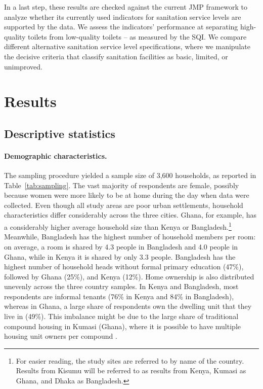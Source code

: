 \documentclass[natbib]{svjour3}                     %
\begin{document}
In a last step, these results are checked against the current JMP framework to analyze whether its currently used indicators for sanitation service levels are supported by the data. We assess the indicators’ performance at separating high-quality toilets from low-quality toilets -- as measured by the SQI. We compare different alternative sanitation service level specifications, where we manipulate the decisive criteria that classify sanitation facilities as basic, limited, or unimproved. 

\FloatBarrier
\section{Results}
\label{sec:results}

\subsection{Descriptive statistics}
\paragraph{Demographic characteristics.}
The sampling procedure yielded a sample size of 3,600 households, as reported in Table~\ref{tab:sampling}. The vast majority of respondents are female, possibly because women were more likely to be at home during the day when data were collected. Even though all study areas are poor urban settlements, household characteristics differ considerably across the three cities. Ghana, for example, has a considerably higher average household size than Kenya or Bangladesh.\footnote{For easier reading, the study sites are referred to by name of the country. Results from Kisumu will be referred to as results from Kenya, Kumasi as Ghana, and Dhaka as Bangladesh.} Meanwhile, Bangladesh has the highest number of household members per room: on average, a room is shared by 4.3 people in Bangladesh and 4.0 people in Ghana, while in Kenya it is shared by only 3.3 people. Bangladesh has the highest number of household heads without formal primary education (47\%), followed by Ghana (25\%), and Kenya (12\%). Home ownership is also distributed unevenly across the three country samples. In Kenya and Bangladesh, most respondents are informal tenants (76\% in Kenya and 84\% in Bangladesh), whereas in Ghana, a large share of respondents own the dwelling unit that they live in (49\%). This imbalance might be due to the large share of traditional compound housing in Kumasi (Ghana), where it is possible to have multiple housing unit owners per compound \citep{Tipple2011}.  
\end{document}
